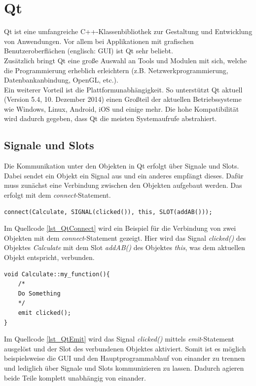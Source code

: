 \section{Qt}
\label{section_Qt}
Qt \cite{qtproject} ist eine umfangreiche C++-Klassenbibliothek zur Gestaltung und Entwicklung von Anwendungen. Vor allem bei Applikationen mit grafischen Benutzeroberflächen (englisch: \ac{GUI}) ist Qt sehr beliebt. \\
Zusätzlich bringt Qt eine große Auswahl an Tools und Modulen mit sich, welche die Programmierung erheblich erleichtern (z.B. Netzwerkprogrammierung, Datenbankanbindung, OpenGL, etc.). \\
Ein weiterer Vorteil ist die Plattformunabhängigkeit. So unterstützt Qt aktuell (Version 5.4, 10. Dezember 2014) einen Großteil der aktuellen Betriebssysteme wie Windows, Linux, Android, iOS und einige mehr. Die hohe Kompatibilität wird dadurch gegeben, dass Qt die meisten Systemaufrufe abstrahiert.

\subsection{Signale und Slots}
\label{QtSignaleSlots}
Die Kommunikation unter den Objekten in Qt erfolgt über Signale und Slots. Dabei sendet ein Objekt ein Signal aus und ein anderes empfängt dieses. Dafür muss zunächst eine Verbindung zwischen den Objekten aufgebaut werden. Das erfolgt mit dem \textit{connect}-Statement.\\

\begin{lstlisting}[caption={Qt \textit{connect}-Statement},label=lst_QtConnect]
connect(Calculate, SIGNAL(clicked()), this, SLOT(addAB()));
\end{lstlisting}

Im Quellcode \ref{lst_QtConnect} wird ein Beispiel für die Verbindung von zwei Objekten mit dem \textit{connect}-Statement gezeigt. Hier wird das Signal \textit{clicked()} des Objektes \textit{Calculate} mit dem Slot \textit{addAB()} des Objektes \textit{this}, was dem aktuellen Objekt entspricht, verbunden. \\

\begin{lstlisting}[caption={Qt \textit{emit}-Statement},label=lst_QtEmit]
void Calculate::my_function(){
	/*
	Do Something
	*/
	emit clicked();	
}
\end{lstlisting}

Im Quellcode \ref{lst_QtEmit} wird das Signal \textit{clicked()} mittels \textit{emit}-Statement ausgelöst und der Slot des verbundenen Objektes aktiviert. Somit ist es möglich beispielsweise die GUI und den Hauptprogrammablauf von einander zu trennen und lediglich über Signale und Slots kommunizieren zu lassen. Dadurch agieren beide Teile komplett unabhängig von einander.

